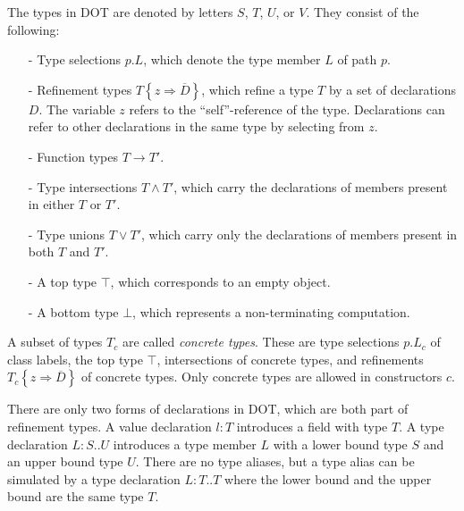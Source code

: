 \documentclass{llncs}
\newif\ifdep\depfalse
\newcommand{\tsel}{\#}
\newcommand{\tfun}{\rightarrow}
\newcommand{\dfun}[3]{(#1\!:\!#2) \Rightarrow #3}
\newcommand{\tand}{\wedge}
\newcommand{\tor}{\vee}
\newcommand{\sing}{.\textbf{type}}
\newcommand{\refine}[2]{\left\{#1 \Rightarrow #2 \right\}}
\newcommand{\seq}[1]{\overline{#1}}
\newcommand{\Ldecl}[3]{#1 : #2..#3}%
\newcommand{\ldecl}[2]{#1 : #2}
\newcommand{\Top}{\top}%
\newcommand{\Bot}{\bot}%
\begin{document}
The types in DOT are denoted by letters $S$, $T$, $U$, or $V$. They consist of the following:
\begin{itemize}
\item[-] Type selections $p.L$, which denote the type member $L$ of path $p$.
\item[-] Refinement types $T \refine z {\seq D}$, which refine a type $T$ by a set of declarations $D$.
         The variable $z$ refers to the ``self''-reference of the type. Declarations can refer to
         other declarations in the same type by selecting from $z$.
\ifdep
  \item[-] Dependent function types $\dfun x T {T'}$.
\else
  \item[-] Function types $T \tfun T'$.
\fi
\item[-] Type intersections $T \tand T'$, which carry the declarations of members present in either $T$ or $T'$.
\item[-] Type unions $T \tor T'$, which carry only the declarations of members present in both $T$ and $T'$.
\item[-] A top type $\Top$, which corresponds to an empty object.
\item[-] A bottom type $\Bot$, which represents a non-terminating computation.
\end{itemize}
A subset of types $T_c$ are called {\em concrete types}. These are type selections
$p.L_c$ of class labels,
the top type $\Top$, intersections of concrete types, and refinements $T_c \refine z {\seq D}$ of concrete types. Only concrete types are allowed in constructors $c$.


There are only two forms of declarations in DOT, which are both part
of refinement types.  A value declaration $\ldecl l T$ introduces a
field with type $T$.  A type declaration $\Ldecl L S U$ introduces a
type member $L$ with a lower bound type $S$ and an upper bound type
$U$. There are no type aliases, but a type alias can be simulated by a
type declaration $\Ldecl L T T$ where the lower bound and the upper
bound are the same type $T$. 

\end{document}
